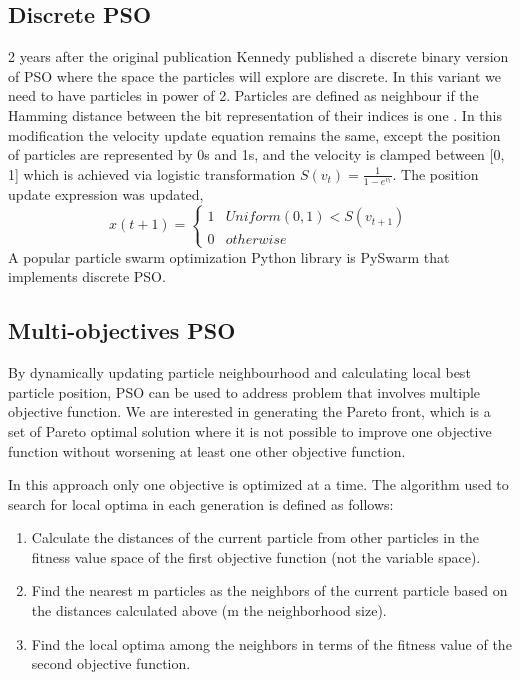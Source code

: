 \documentclass{article}
\begin{document}
\subsection{Discrete PSO}
2 years after the original publication Kennedy \cite{kennedy1997discrete} published a discrete binary version of PSO where the space the particles will explore are discrete. In this variant we need to have particles in power of 2. Particles are defined as neighbour if the Hamming distance between the bit representation of their indices is one \cite{abdelbar2003swarm}. In this modification the velocity update equation remains the same, except the position of particles are represented by 0s and 1s, and the velocity is clamped between [0, 1] which is achieved via logistic transformation $S(v_t) = \frac{1}{1 - e^{v_t}}$. The position update expression was updated,
\begin{equation}
x(t+1) = 
\begin{cases} 
1 & Uniform(0,1) < S(v_{t+1}) \\ 
0 & otherwise 
\end{cases}
\end{equation}
A popular particle swarm optimization Python library is PySwarm that implements discrete PSO.\cite{pyswarms.discrete}

\subsection{Multi-objectives PSO}
 
By dynamically updating particle neighbourhood and calculating local best particle position, PSO can be used to address problem that involves multiple objective function. We are interested in generating the Pareto front, which is a set of Pareto optimal solution where it is not possible to improve one objective function without worsening at least one other objective function.

In this approach only one objective is optimized at a time. The algorithm used to search for local optima in each generation
is defined as follows:
\begin{enumerate}
    \item Calculate the distances of the current particle from other particles in the fitness value space of the first objective function (not the variable space).

    \item Find the nearest m particles as the neighbors of the current particle based on the distances calculated above (m the neighborhood size).

    \item Find the local optima among the neighbors in terms of the fitness value of the second objective function.
\end{enumerate}
\end{document}
